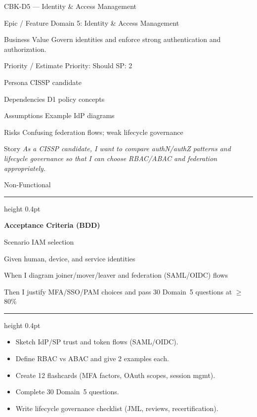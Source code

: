 \documentclass[11pt,a4paper]{article}
\providecommand{\square}{\fbox{\rule{0pt}{0.85ex}\rule{0.85ex}{0pt}}}%
\newcommand{\citem}{\item[$\square$]}
\newcommand{\Tag}[1]{\tcbox[on line, colback=PillBack, colframe=PillBack,
  coltext=PillText, boxrule=0pt, arc=2mm, left=2pt, right=2pt, top=1pt, bottom=1pt]{\small #1}}
\newcommand{\ThinRule}{\par\vspace{4pt}\hrule height 0.4pt\par\vspace{4pt}}
\begin{document}
\clearpage
\begin{StoryCardBox}{CBK-D5 --- Identity \& Access Management}
\begin{metadesc}
\item[Epic / Feature] Domain 5: Identity \& Access Management
\item[Business Value] Govern identities and enforce strong authentication and authorization.
\item[Priority / Estimate] Priority: Should \quad SP: 2
\item[Persona] CISSP candidate
\item[Dependencies] D1 policy concepts
\item[Assumptions] Example IdP diagrams
\item[Risks] Confusing federation flows; weak lifecycle governance
\item[Story] \textit{As a CISSP candidate, I want to compare authN/authZ patterns and lifecycle governance so that I can choose RBAC/ABAC and federation appropriately.}
\item[Non-Functional] \Tag{Security} \Tag{Privacy}
\end{metadesc}

\ThinRule
\textbf{Acceptance Criteria (BDD)}
\begin{metadesc}
\item[Scenario] IAM selection
\item[Given] human, device, and service identities
\item[When] I diagram joiner/mover/leaver and federation (SAML/OIDC) flows
\item[Then] I justify MFA/SSO/PAM choices and pass 30 Domain~5 questions at $\geq$ 80\%
\end{metadesc}

\ThinRule
\begin{TasksBox}
\begin{itemize}
  \citem Sketch IdP/SP trust and token flows (SAML/OIDC).
  \citem Define RBAC vs ABAC and give 2 examples each.
  \citem Create 12 flashcards (MFA factors, OAuth scopes, session mgmt).
  \citem Complete 30 Domain~5 questions.
  \citem Write lifecycle governance checklist (JML, reviews, recertification).
\end{itemize}
\end{TasksBox}
\end{StoryCardBox}
\end{document}
